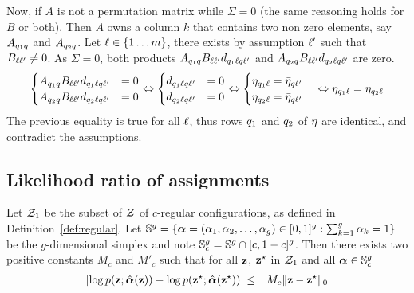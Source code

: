 %
Now, if $A$ is not a permutation matrix while $\Sigma = 0$ (the same reasoning holds for $B$ or both). Then $A$ owns a column $k$ that contains two non zero elements, say $A_{q_1 q}$ and $A_{q_2 q}$. Let $\ell \in \{1\dots m\}$, there exists by assumption $\ell'$ such that $B_{\ell \ell'} \neq 0$. As $\Sigma=0$, both products $A_{q_1 q} B_{\ell \ell'} d_{q_1 \ell q \ell'}$ and $A_{q_2 q} B_{\ell \ell'} d_{q_2 \ell q \ell'}$ are zero.
\begin{equation*}
  \begin{cases}
    A_{\kk_1 \kk} B_{\el \el'} d_{\kk_1 \el \kk \el'} & = 0 \\
    A_{\kk_2 \kk} B_{\el \el'} d_{\kk_2 \el \kk \el'} & = 0 \\
  \end{cases}
  \Leftrightarrow
  \begin{cases}
    d_{\kk_1 \el \kk \el'} & = 0 \\
    d_{\kk_2 \el \kk \el'} & = 0 \\
  \end{cases}
  \Leftrightarrow
  \begin{cases}
    \etaa_{\kk_1 \el} = \bar{\etaa}_{\kk \el'} & \\
    \etaa_{\kk_2 \el} = \bar{\etaa}_{\kk \el'} & \\
  \end{cases}
  \Leftrightarrow
  \etaa_{\kk_1 \el} = \etaa_{\kk_2 \el}
\end{equation*}
The previous equality is true for all $\ell$, thus rows $q_1$ and $q_2$ of $\eta$ are identical, and contradict the assumptions. \proofend 
%

\subsection{Likelihood ratio of assignments}

\begin{lemme}\label{lemme:marginalprobabilties}\textbf{}

Let $\mathcal{Z}_1$ be the subset of $\mathcal{Z}$ of $c$-regular configurations, as defined in Definition~\ref{def:regular}. 
Let $\mathbb{S}^{g} = \{ \boldsymbol{\alpha} = (\alpha_1, \alpha_2, \dots, \alpha_g) \in [0, 1]^g : \sum_{k=1}^g \alpha_k = 1\}$ be the $g$-dimensional simplex and
note $\mathbb{S}^{g}_c = \mathbb{S}^{g} \cap [c, 1-c]^g$. Then there exists two positive constants $M_c$ and $M'_c$ such that for all $\mathbf{z}$, $\mathbf{z}^\star$ in $\mathcal{Z}_1$ and all $\boldsymbol{\alpha} \in \mathbb{S}_c^{g}$
\begin{eqnarray*}
\left| \log \prob(\bz; \hat{\bpi}(\bz)) - \log \prob(\bzs; \hat{\bpi}(\bzs)) \right| & \leq & M_c \|\bz - \bzs \|_0 
\end{eqnarray*}
\end{lemme}

